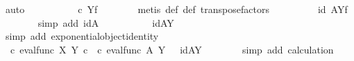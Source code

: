 \begin{isabellebody}
\ auto\isanewline
\ \ \ \ \isamarkupfalse%
\ \isamarkupfalse%
\ {\isachardoublequoteopen}{\isachardot}{\kern0pt}{\isachardot}{\kern0pt}{\isachardot}{\kern0pt}\ {\isacharequal}{\kern0pt}\ {\isacharparenleft}{\kern0pt}{\isasymphi}\ {\isasymcirc}\isactrlsub c\ {\isasympsi}{\isacharparenright}{\kern0pt}\isactrlbsup Y\isactrlesup \isactrlsub f{\isachardoublequoteclose}\isanewline
\ \ \ \ \ \ \isamarkupfalse%
\ {\isacharparenleft}{\kern0pt}metis\ {\isasymphi}{\isacharunderscore}{\kern0pt}def\ {\isasympsi}{\isacharunderscore}{\kern0pt}def\ transpose{\isacharunderscore}{\kern0pt}factors{\isacharparenright}{\kern0pt}\isanewline
\ \ \ \ \isamarkupfalse%
\ \isamarkupfalse%
\ {\isachardoublequoteopen}{\isachardot}{\kern0pt}{\isachardot}{\kern0pt}{\isachardot}{\kern0pt}\ {\isacharequal}{\kern0pt}\ {\isacharparenleft}{\kern0pt}id\ A{\isacharparenright}{\kern0pt}\isactrlbsup Y\isactrlesup \isactrlsub f{\isachardoublequoteclose}\isanewline
\ \ \ \ \ \ \isamarkupfalse%
\ {\isacharparenleft}{\kern0pt}simp\ add{\isacharcolon}{\kern0pt}\ idA{\isacharparenright}{\kern0pt}\isanewline
\ \ \ \ \isamarkupfalse%
\ \isamarkupfalse%
\ {\isachardoublequoteopen}{\isachardot}{\kern0pt}{\isachardot}{\kern0pt}{\isachardot}{\kern0pt}\ \ {\isacharequal}{\kern0pt}\ id{\isacharparenleft}{\kern0pt}A\isactrlbsup Y\isactrlesup {\isacharparenright}{\kern0pt}{\isachardoublequoteclose}\isanewline
\ \ \ \ \ \ \isamarkupfalse%
\ {\isacharparenleft}{\kern0pt}simp\ add{\isacharcolon}{\kern0pt}\ exponential{\isacharunderscore}{\kern0pt}object{\isacharunderscore}{\kern0pt}identity{}{\isacharparenright}{\kern0pt}\isanewline
\ \ \ \ \isamarkupfalse%
\ \isamarkupfalse%
\ {\isachardoublequoteopen}{\isacharparenleft}{\kern0pt}{\isasymphi}\ {\isasymcirc}\isactrlsub c\ eval{\isacharunderscore}{\kern0pt}func\ X\ Y{\isacharparenright}{\kern0pt}\isactrlsup {\isasymsharp}\ {\isasymcirc}\isactrlsub c\ {\isacharparenleft}{\kern0pt}{\isasympsi}\ {\isasymcirc}\isactrlsub c\ eval{\isacharunderscore}{\kern0pt}func\ A\ Y{\isacharparenright}{\kern0pt}\isactrlsup {\isasymsharp}\ \ {\isacharequal}{\kern0pt}\ id{\isacharparenleft}{\kern0pt}A\isactrlbsup Y\isactrlesup {\isacharparenright}{\kern0pt}{\isachardoublequoteclose}\isanewline
\ \ \ \ \ \ \isamarkupfalse%
\ {\isacharparenleft}{\kern0pt}simp\ add{\isacharcolon}{\kern0pt}\ calculation{\isacharparenright}{\kern0pt}\isanewline
\ \ \isamarkupfalse%
\isanewline

\end{isabellebody}
